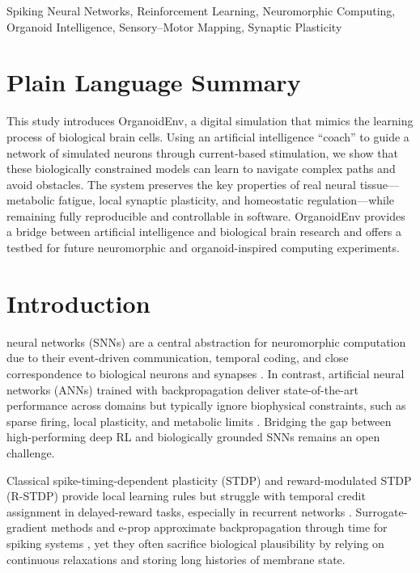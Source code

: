 \documentclass[journal,twocolumn]{IEEEtran}
\begin{document}
\begin{IEEEkeywords}
Spiking Neural Networks, Reinforcement Learning, Neuromorphic
Computing, Organoid Intelligence, Sensory--Motor Mapping, Synaptic
Plasticity
\end{IEEEkeywords}

\section*{Plain Language Summary}

This study introduces OrganoidEnv, a digital simulation that mimics
the learning process of biological brain cells.  Using an artificial
intelligence ``coach'' to guide a network of simulated neurons through
current-based stimulation, we show that these biologically constrained
models can learn to navigate complex paths and avoid obstacles.  The
system preserves the key properties of real neural tissue---metabolic
fatigue, local synaptic plasticity, and homeostatic regulation---while
remaining fully reproducible and controllable in software.  OrganoidEnv
provides a bridge between artificial intelligence and biological brain
research and offers a testbed for future neuromorphic and
organoid-inspired computing experiments.

\section{Introduction}

 neural networks (SNNs) are a central
abstraction for neuromorphic computation due to their event-driven
communication, temporal coding, and close correspondence to biological
neurons and synapses \cite{Izhikevich2003simple,NeuromorphicReview2019}.
In contrast, artificial neural networks (ANNs) trained with
backpropagation deliver state-of-the-art performance across domains
but typically ignore biophysical constraints, such as sparse firing,
local plasticity, and metabolic limits \cite{Mnih2015human}.
Bridging the gap between high-performing deep RL and biologically
grounded SNNs remains an open challenge.

Classical spike-timing-dependent plasticity (STDP) and
reward-modulated STDP (R-STDP) provide local learning rules but
struggle with temporal credit assignment in delayed-reward tasks,
especially in recurrent networks
\cite{Florian2007rstdp,FarriesFairhall2007}.  Surrogate-gradient
methods and e-prop approximate backpropagation through time for
spiking systems \cite{Bellec2018l2l,DirectTrainingSNN2024}, yet they
often sacrifice biological plausibility by relying on continuous
relaxations and storing long histories of membrane state.
\end{document}
